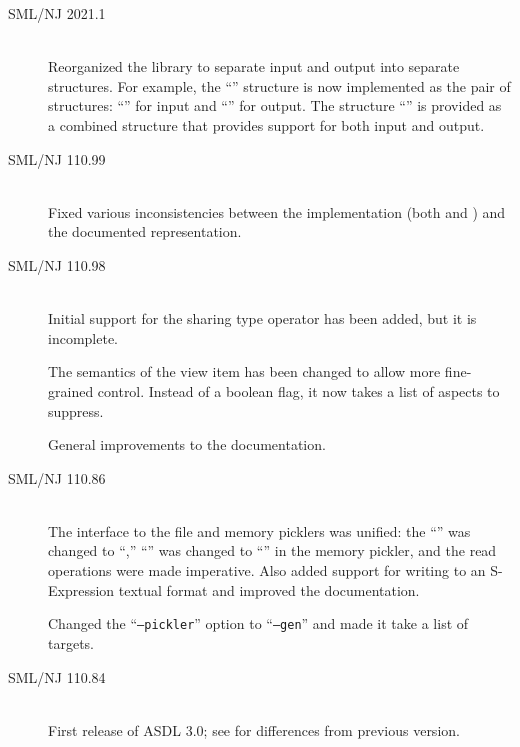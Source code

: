 \begin{description}
  \item[SML/NJ 2021.1]
    \mbox{}\\[0.5em]
    Reorganized the \sml{} library to separate input and output into separate
    structures.  For example, the ``'' structure is now
    implemented as the pair of structures: ``'' for input
    and ``'' for output.  The structure ``''
    is provided as a combined structure that provides support for both input
    and output.

  \item[SML/NJ 110.99]
    \mbox{}\\[0.5em]
    Fixed various inconsistencies between the implementation (both \Cplusplus{} and
    \sml{}) and the documented representation.

  \item[SML/NJ 110.98]
    \mbox{}\\[0.5em]
    Initial support for the sharing type operator has been added, but it is incomplete.

    The semantics of the  view item has been changed to allow more
    fine-grained control.  Instead of a boolean flag, it now takes a list of
    aspects to suppress.

    General improvements to the documentation.

  \item[SML/NJ 110.86]
    \mbox{}\\[0.5em]
    The interface to the file and memory picklers was unified: the ``''
    was changed to ``,'' ``'' was changed to
    ``'' in the memory pickler, and the read operations were made
    imperative.
    Also added support for writing to an S-Expression textual format and improved
    the documentation.

    Changed the ``\texttt{--pickler}'' option to ``\texttt{--gen}'' and made it take
    a list of targets.

  \item[SML/NJ 110.84]
    \mbox{}\\[0.5em]
    First release of ASDL 3.0; see  for differences from previous
    version.
\end{description}%
